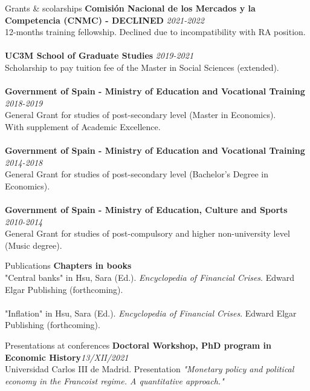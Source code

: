 \documentclass{resume} %
\begin{document}
\begin{rSection}{Grants \& scolarships}
	{\bf Comisión Nacional de los Mercados y la Competencia (CNMC) - DECLINED} \hfill {\em 2021-2022} \\ 
	12-months training fellowship. Declined due to incompatibility with RA position. \\
	\\{\bf UC3M School of Graduate Studies} \hfill {\em 2019-2021} \\ Scholarship %
	to pay tuition fee of the Master in Social Sciences (extended). \\ 
	\\{\bf Government of Spain - Ministry of Education and Vocational Training} \hfill {\em 2018-2019} \\ General Grant for studies of post-secondary level (Master in Economics).\\ With supplement of Academic Excellence.\\
	\\{\bf Government of Spain - Ministry of Education and Vocational Training} \hfill {\em 2014-2018} \\ General Grant for studies of post-secondary level (Bachelor's Degree in Economics).\\
	\\{\bf Government of Spain - Ministry of Education, Culture and Sports} \hfill {\em 2010-2014}\\
	General Grant for studies of post-compulsory and higher non-university level (Music degree).
\end{rSection}

\vspace{2mm}


\begin{rSection}{Publications}
	{\bf Chapters in books}\hfill \\
	"Central banks" in Hsu, Sara (Ed.). \textit{Encyclopedia of Financial Crises}. Edward Elgar Publishing (forthcoming). \\
	\\ "Inflation" in Hsu, Sara (Ed.). \textit{Encyclopedia of Financial Crises}. Edward Elgar Publishing (\mbox{forthcoming}). \\

\end{rSection}

\begin{rSection}{Presentations at conferences}
	{\bf Doctoral Workshop, PhD program in Economic History}\hfill {\em 13/XII/2021}\\
	Universidad Carlos III de Madrid. Presentation \textit{"Monetary policy and political economy in the Francoist regime. A quantitative approach."}\\
\end{rSection}
\end{document}
